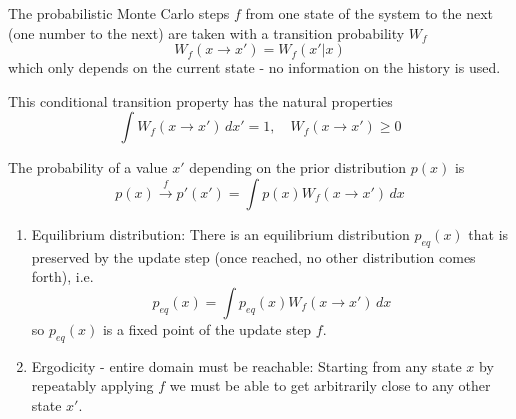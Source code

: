 The probabilistic Monte Carlo steps $f$ from one state of the system to the next (one number to the next)
are taken with a transition probability $W_f$
\begin{equation}
    W_f(x\rightarrow x') = W_f(x'|x)
\end{equation}
which \textcolor{blue1}{only depends on the current state} - no information on the history is used.

This conditional transition property has the natural properties
\begin{equation}
    \int W_f(x \rightarrow x') \, dx' = 1, \quad W_f(x \rightarrow x') \geq 0
\end{equation}


The probability of a value $x'$ depending on the prior distribution $p(x)$ is
\begin{equation}
    p(x) \overset{f}\rightarrow p'(x') = \int p(x) W_f(x\rightarrow x') \, dx
\end{equation}


\begin{enumerate}
    \item \textcolor{blue1}{Equilibrium distribution}: There is an equilibrium distribution $p_{eq}(x)$ that is
    preserved by the update step (once reached, no other distribution comes forth), i.e.
    \begin{equation}
        \label{eq:fix_point_MK}
        p_{eq}(x) = \int p_{eq}(x) W_f(x\rightarrow x') \, dx
    \end{equation}
    so $p_{eq}(x)$ is a fixed point of the update step $f$.
    \item \textcolor{blue1}{Ergodicity - entire domain must be reachable}: Starting from any state $x$ by repeatably
    applying $f$ we must be able to get arbitrarily close to any other state $x'$.
\end{enumerate}

